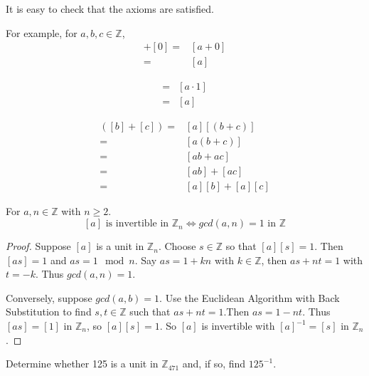 It is easy to check that the axioms are satisfied.

For example, for $a,b,c\in\mathbb{Z}$, 
\begin{align*}
    [a] + [0] =& [a + 0]\\
    =& [a]
\end{align*}

\begin{align*}
    [a][1] = & [a\cdot 1]\\
    = & [a]
\end{align*}

\begin{align*}
    [a]([b] + [c]) = & [a][(b + c)]\\
    = & [a(b + c)] \\
    = & [ab + ac] \\
    = & [ab] + [ac]\\
    = & [a][b] + [a][c]
\end{align*}

\begin{thm}
For $a,n\in\mathbb{Z}$ with $n\geq 2$. \[[a] \text{ is invertible in } \mathbb{Z}_n \Longleftrightarrow gcd(a,n) = 1 \text{ in }\mathbb{Z}\]
\end{thm}

\begin{proof}
Suppose $[a]$ is a unit in $\mathbb{Z}_n$. Choose $s\in\mathbb{Z}$ so that $[a][s] = 1$. Then $[as] = 1$ and $as = 1 \mod n$. Say $as = 1 + kn$ with $k\in\mathbb{Z}$, then $as + nt = 1$ with $t = -k$. Thus $gcd(a,n) = 1$.

Conversely, suppose $gcd(a,b) = 1$. Use the Euclidean Algorithm with Back Substitution to find $s,t\in \mathbb{Z}$ such that $as+nt = 1$.Then $as = 1 -nt$. Thus $[as] = [1]$ in $\mathbb{Z}_n$, so $[a][s] = 1$. So $[a]$ is invertible with $[a]^{-1} = [s]$ in $\mathbb{Z}_n$. 
\end{proof}

\begin{exmp}
Determine whether 125 is a unit in $\mathbb{Z}_{471}$ and, if so, find $125^{-1}$.
\end{exmp}